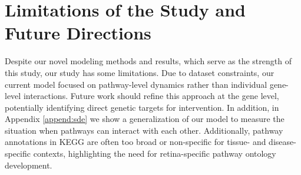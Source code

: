 \documentclass{article} %
\begin{document}























\section{Limitations of the Study and Future Directions}
Despite our novel modeling methods and results, which serve as the strength of this study, our study has some limitations. Due to dataset constraints, our current model focused on pathway-level dynamics rather than individual gene-level interactions. Future work should refine this approach at the gene level, potentially identifying direct genetic targets for intervention. In addition, in Appendix \ref{append:sde} we show a generalization of our model to measure the situation when pathways can interact with each other. Additionally, pathway annotations in KEGG are often too broad or non-specific for tissue- and disease-specific contexts, highlighting the need for retina-specific pathway ontology development.
\end{document}
